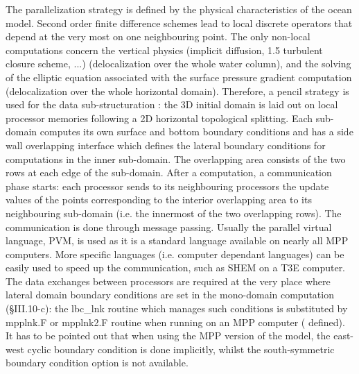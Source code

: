 The parallelization strategy is defined by the physical characteristics of the 
ocean model. Second order finite difference schemes lead to local discrete 
operators that depend at the very most on one neighbouring point. The only 
non-local computations concern the vertical physics (implicit diffusion, 1.5 
turbulent closure scheme, ...) (delocalization over the whole water column), 
and the solving of the elliptic equation associated with the surface pressure 
gradient computation (delocalization over the whole horizontal domain). 
Therefore, a pencil strategy is used for the data sub-structuration 
: the 3D initial domain is laid out on local processor 
memories following a 2D horizontal topological splitting. Each sub-domain 
computes its own surface and bottom boundary conditions and has a side 
wall overlapping interface which defines the lateral boundary conditions for 
computations in the inner sub-domain. The overlapping area consists of the 
two rows at each edge of the sub-domain. After a computation, a communication 
phase starts: each processor sends to its neighbouring processors the update 
values of the points corresponding to the interior overlapping area to its 
neighbouring sub-domain (i.e. the innermost of the two overlapping rows). 
The communication is done through message passing. Usually the parallel virtual 
language, PVM, is used as it is a standard language available on  nearly  all 
MPP computers. More specific languages (i.e. computer dependant languages) 
can be easily used to speed up the communication, such as SHEM on a T3E 
computer. The data exchanges between processors are required at the very 
place where lateral domain boundary conditions are set in the mono-domain 
computation (\S III.10-c): the lbc\_lnk routine which manages such conditions 
is substituted by mpplnk.F or mpplnk2.F routine when running on an MPP 
computer ( defined). It has to be pointed out that when using 
the MPP version of the model, the east-west cyclic boundary condition is done 
implicitly, whilst the south-symmetric boundary condition option is not available.

